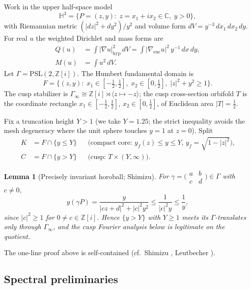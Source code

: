 \documentclass[11pt]{amsart}
\newtheorem{lemma}[theorem]{Lemma}
\newcommand{\HH}{\mathbb{H}^3}
\newcommand{\ZZ}{\mathbb{Z}}
\newcommand{\CC}{\mathbb{C}}
\newcommand{\PSL}{\mathrm{PSL}}
\begin{document}
Work in the upper half-space model
\[
  \HH = \bigl\{ P=(z,y):\; z=x_1+ix_2\in\CC,\; y>0\bigr\},
\]
with Riemannian metric $(|dz|^2+dy^2)/y^2$ and volume form
$dV=y^{-3}\,dx_1\,dx_2\,dy$.  For real $u$ the weighted Dirichlet and mass
forms are
\begin{align*}
  Q(u) &= \int |\nabla u|^2_{\mathrm{hyp}}\,dV
        = \int |\nabla_{\mathrm{euc}} u|^2\, y^{-1}\,dx\,dy,\\
  M(u) &= \int u^2\,dV.
\end{align*}
Let $\Gamma=\PSL(2,\ZZ[i])$.  The Humbert fundamental domain is
\[
  F=\bigl\{(z,y):\; x_1\in[-\tfrac12,\tfrac12],\;
  x_2\in[0,\tfrac12],\; |z|^2+y^2\ge 1\bigr\}.
\]
The cusp stabilizer is $\Gamma_\infty\cong\ZZ[i]\rtimes\langle z\mapsto -z\rangle$;
the cusp cross-section orbifold $T$ is the coordinate rectangle
$x_1\in[-\tfrac12,\tfrac12]$, $x_2\in[0,\tfrac12]$, of Euclidean area
$|T|=\tfrac12$.

Fix a truncation height $Y>1$ (we take $Y=1.25$; the strict inequality
avoids the mesh degeneracy where the unit sphere touches $y=1$ at $z=0$).
Split
\begin{align*}
  K &= F\cap\{y\le Y\}
    &&\text{(compact core: $y_f(z)\le y\le Y$, $y_f=\sqrt{1-|z|^2}$),}\\
  C &= F\cap\{y>Y\}
    &&\text{(cusp: $T\times(Y,\infty)$).}
\end{align*}

\begin{lemma}[Precisely invariant horoball; Shimizu]\label{lem:shimizu}
For $\gamma=\bigl(\begin{smallmatrix}a&b\\c&d\end{smallmatrix}\bigr)\in\Gamma$
with $c\neq 0$,
\[
  y(\gamma P)=\frac{y}{|cz+d|^2+|c|^2 y^2}\le\frac{1}{|c|^2 y}\le\frac{1}{y},
\]
since $|c|^2\ge 1$ for $0\neq c\in\ZZ[i]$.  Hence $\{y>Y\}$ with $Y\ge 1$
meets its $\Gamma$-translates only through $\Gamma_\infty$, and the cusp
Fourier analysis below is legitimate on the quotient.
\end{lemma}

The one-line proof above is self-contained (cf.\ Shimizu \cite{Shimizu63},
Leutbecher \cite{Leutbecher67}).

\subsection{Spectral preliminaries}
\end{document}
